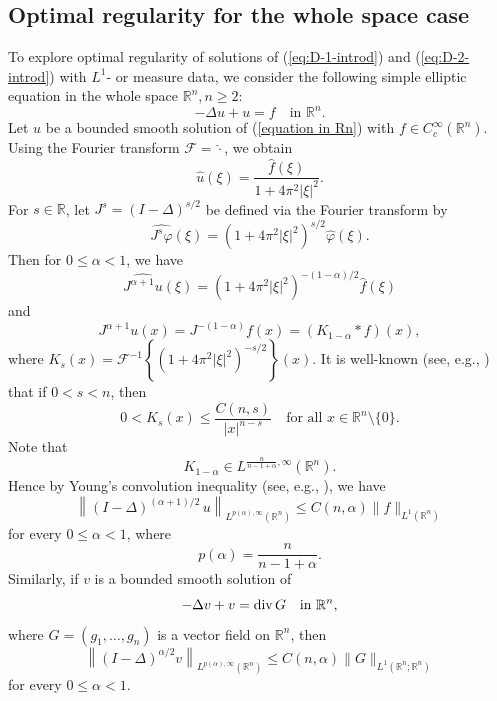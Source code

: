 \documentclass[reqno,centertags,11pt]{amsart}
\theoremstyle{definition}
\numberwithin{thm}{section}
\numberwithin{equation}{section}
\newcommand{\R}{{\mathbb{R}}}
\begin{document}
\subsection{Optimal regularity for the whole space case}\label{sec1.1}

To explore optimal  regularity of solutions of (\ref{eq:D-1-introd}) and (\ref{eq:D-2-introd}) with $L^1$- or measure data, we    consider
the following simple elliptic   equation in the whole space $\R^n , n \ge 2$:
\begin{equation}\label{equation in Rn}
  -\Delta u +u  = f \quad\mbox{in}\,\, \R^n .
\end{equation}
Let $u$  be a bounded smooth  solution of (\ref{equation in Rn}) with $f \in C_c^\infty (\R^n )$.
Using the Fourier transform $\mathscr{F} = \widehat{\cdot}$, we obtain
\[
\widehat{u}(\xi ) =  \frac{\widehat{f}(\xi)}{1+ 4 \pi^2  |\xi|^{2}} .
\]
For $s \in \R$, let $ J^s = (I-\Delta )^{s/2}$ be defined via the Fourier transform  by
\[
\widehat{J^s   \varphi}(\xi )= \left(1+ 4 \pi^2  |\xi|^2  \right)^{s/2} \widehat{\varphi} (\xi ).
\]
Then for  $0 \le  \alpha < 1$, we have
\[
\widehat{J^{\alpha +1} u}(\xi ) = \left(1+ 4 \pi^2  |\xi|^2  \right)^{-(1-\alpha)/2}\widehat{f}(\xi)
\]
and
\[
J^{\alpha+1}  u (x)  = J^{-(1-\alpha)} f (x)  = \left( K_{1-\alpha} * f \right) (x) ,
\]
where    $K_{s} (x) = \mathscr{F}^{-1}  \left\{ (1+ 4 \pi^2  |\xi|^2  )^{-s/2}  \right\}(x) $. It is well-known (see, e.g., \cite[Proposition 6.1.5]{Gra2}) that if $0< s< n$,
then
\[
 0<   K_{s} (x) \le  \frac{C(n, s )}{|x|^{n-s}} \quad \mbox{for all}\,\, x \in \R^n \setminus \{ 0\}.
\]
Note   that
$$
K_{1-\alpha} \in L^{\frac{n}{n-1+\alpha},\infty}(\R^n ).
$$
 Hence by Young's convolution inequality (see, e.g., \cite[Theorem 1.2.13]{Gra}), we have
\begin{equation}\label{weak est on Rn}
\left\| (I-\Delta )^{(\alpha+1)/2} \,  u \right\|_{L^{p(\alpha) ,\infty}(\R^n )} \le C(n,\alpha ) \|f\|_{L^1 (\R^n )}
\end{equation}
for every $0 \le  \alpha < 1$, where
\begin{equation}\label{def-pa}
p(\alpha) = \frac{n}{n-1+\alpha}.
\end{equation}
Similarly, if $v$ is a bounded  smooth   solution of
\begin{equation}\label{equation-div in Rn}
-\Delta v + v  = {\rm div}\, G\quad\mbox{in}\,\,\R^n ,
\end{equation}
where $G = (g_1 , \ldots , g_n )$ is a   vector field on $\R^n$, then
\[
\left\| (I-\Delta )^{\alpha/2} v \right\|_{L^{p(\alpha) ,\infty}(\R^n )} \le C(n,\alpha ) \|G\|_{L^1 (\R^n ; \R^n)}
\]
for every $0 \le  \alpha < 1$.
\end{document}
